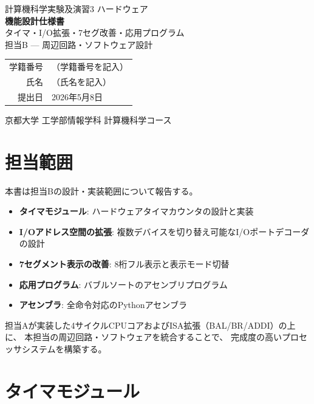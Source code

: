 \documentclass[a4paper,11pt]{ltjsarticle}
\begin{document}
\begin{titlepage}
\centering
\vspace*{3cm}
{\LARGE 計算機科学実験及演習3 ハードウェア}\\[1cm]
{\Huge\bfseries 機能設計仕様書}\\[0.5cm]
{\LARGE タイマ・I/O拡張・7セグ改善・応用プログラム}\\[0.5cm]
{\Large 担当B — 周辺回路・ソフトウェア設計}\\[3cm]
\begin{tabular}{rl}
学籍番号 & （学籍番号を記入） \\[0.5em]
氏名     & （氏名を記入） \\[0.5em]
提出日   & 2026年5月8日 \\
\end{tabular}
\vfill
京都大学 工学部情報学科 計算機科学コース
\end{titlepage}

\tableofcontents
\clearpage


\section{担当範囲}

本書は担当Bの設計・実装範囲について報告する。

\begin{itemize}
\item \textbf{タイマモジュール}: ハードウェアタイマカウンタの設計と実装
\item \textbf{I/Oアドレス空間の拡張}: 複数デバイスを切り替え可能なI/Oポートデコーダの設計
\item \textbf{7セグメント表示の改善}: 8桁フル表示と表示モード切替
\item \textbf{応用プログラム}: バブルソートのアセンブリプログラム
\item \textbf{アセンブラ}: 全命令対応のPythonアセンブラ
\end{itemize}

担当Aが実装した4サイクルCPUコアおよびISA拡張（BAL/BR/ADDI）の上に、
本担当の周辺回路・ソフトウェアを統合することで、
完成度の高いプロセッサシステムを構築する。


\section{タイマモジュール}
\end{document}
